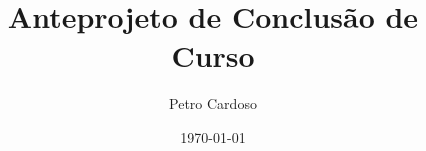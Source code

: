 \documentclass[12pt, a4paper]{article}
\begin{document}
\title{Anteprojeto de Conclusão de Curso}
\author{Petro Cardoso}
\date{\today}




\newpage

\listoffigures
\newpage

\listoftables
\newpage

\tableofcontents
\newpage


\newpage

\newpage


\newpage


\newpage


\newpage


\newpage
\nocite{*}


\end{document}

